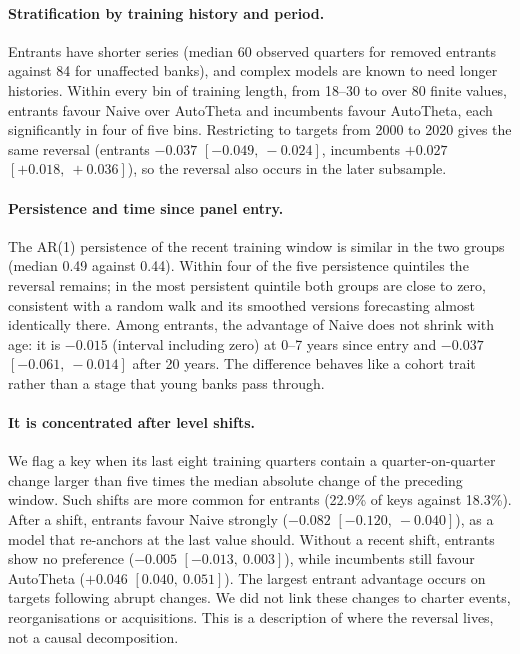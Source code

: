 \documentclass[11pt]{article}
\begin{document}
\paragraph{Stratification by training history and period.} Entrants have shorter series (median 60 observed quarters for removed entrants against 84 for unaffected banks), and complex models are known to need longer histories. Within every bin of training length, from 18--30 to over 80 finite values, entrants favour Naive over AutoTheta and incumbents favour AutoTheta, each significantly in four of five bins. Restricting to targets from 2000 to 2020 gives the same reversal (entrants $-0.037$ $[-0.049,\ -0.024]$, incumbents $+0.027$ $[+0.018,\ +0.036]$), so the reversal also occurs in the later subsample.

\paragraph{Persistence and time since panel entry.} The AR(1) persistence of the recent training window is similar in the two groups (median 0.49 against 0.44). Within four of the five persistence quintiles the reversal remains; in the most persistent quintile both groups are close to zero, consistent with a random walk and its smoothed versions forecasting almost identically there. Among entrants, the advantage of Naive does not shrink with age: it is $-0.015$ (interval including zero) at 0--7 years since entry and $-0.037$ $[-0.061,\ -0.014]$ after 20 years. The difference behaves like a cohort trait rather than a stage that young banks pass through.

\paragraph{It is concentrated after level shifts.} We flag a key when its last eight training quarters contain a quarter-on-quarter change larger than five times the median absolute change of the preceding window. Such shifts are more common for entrants (22.9\% of keys against 18.3\%). After a shift, entrants favour Naive strongly ($-0.082$ $[-0.120,\ -0.040]$), as a model that re-anchors at the last value should. Without a recent shift, entrants show no preference ($-0.005$ $[-0.013,\ 0.003]$), while incumbents still favour AutoTheta ($+0.046$ $[0.040,\ 0.051]$). The largest entrant advantage occurs on targets following abrupt changes. We did not link these changes to charter events, reorganisations or acquisitions. This is a description of where the reversal lives, not a causal decomposition.
\end{document}
